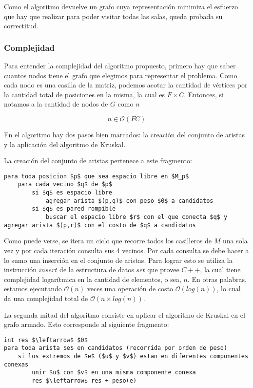 Como el algoritmo devuelve un grafo cuya representación minimiza el esfuerzo que hay que realizar para poder visitar todas las salas, queda probada su correctitud. \QEDB

\subsubsection{Complejidad}

Para entender la complejidad del algoritmo propuesto, primero hay que saber cuantos nodos tiene el grafo que elegimos para representar el problema.
Como cada nodo es una casilla de la matriz, podemos acotar la cantidad de vértices por la cantidad total de posiciones en la misma, la cual es $F \times C$. Entonces, si notamos a la cantidad de nodos de $G$ como $n$

$$n \in \mathcal{O}(FC)$$

En el algoritmo hay dos pasos bien marcados: la creación del conjunto de aristas y la aplicación del algoritmo de Kruskal.

La creación del conjunto de aristas pertenece a este fragmento:

\begin{lstlisting}
para toda posicion $p$ que sea espacio libre en $M_p$
	para cada vecino $q$ de $p$
		si $q$ es espacio libre
			agregar arista $(p,q)$ con peso $0$ a candidatos
		si $q$ es pared rompible
			buscar el espacio libre $r$ con el que conecta $q$ y agregar arista $(p,r)$ con el costo de $q$ a candidatos
\end{lstlisting}

Como puede verse, se itera un ciclo que recorre todos los casilleros de $M$ una sola vez y por cada iteración consulta sus 4 vecinos. Por cada consulta se debe hacer a lo sumo una inserción en el conjunto de aristas. Para lograr esto se utiliza la instrucción $insert$ de la estructura de datos $set$ que provee $C++$, la cual tiene complejidad logarítmica en la cantidad de elementos, o sea, $n$. En otras palabras, estamos ejecutando $\mathcal{O}(n)$ veces una operación de costo $\mathcal{O}(log(n))$, lo cual da una complejidad total de $\mathcal{O}(n \times log(n))$.

La segunda mitad del algoritmo consiste en aplicar el algoritmo de Kruskal en el grafo armado. Esto corresponde al siguiente fragmento:

\begin{lstlisting}
int res $\leftarrow$ $0$
para toda arista $e$ en candidatos (recorrida por orden de peso)
	si los extremos de $e$ ($u$ y $v$) estan en diferentes componentes conexas
		unir $u$ con $v$ en una misma componente conexa
		res $\leftarrow$ res + peso(e)
\end{lstlisting}

